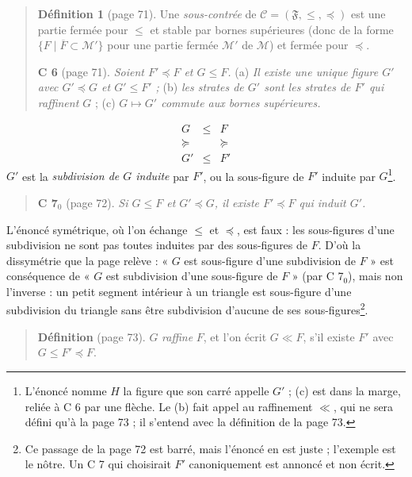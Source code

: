 \documentclass[11pt,a4paper]{article}
\begin{document}
\begin{quote}
\textbf{Définition 1} (page 71). Une \emph{sous-contrée} de $\mathcal{C} =
(\mathfrak{F}, \leq, \preccurlyeq)$ est une partie fermée pour $\leq$ et stable
par bornes supérieures (donc de la forme $\{F \mid \overline{F} \subset
\mathcal{M}'\}$ pour une partie fermée $\mathcal{M}'$ de $\mathcal{M}$) et
fermée pour $\preccurlyeq$.

\textbf{C 6} (page 71). \emph{Soient $F' \preccurlyeq F$ et $G \leq F$.} (a)
\emph{Il existe une unique figure $G'$ avec $G' \preccurlyeq G$ et $G' \leq
F'$ ;} (b) \emph{les strates de $G'$ sont les strates de $F'$ qui raffinent
$G$} ; (c) \emph{$G \mapsto G'$ commute aux bornes supérieures.}
\end{quote}
\[
\begin{array}{ccc}
G & \leq & F \\
\succcurlyeq & & \succcurlyeq \\
G' & \leq & F'
\end{array}
\]
$G'$ est la \emph{subdivision de $G$ induite} par $F'$, ou la sous-figure de
$F'$ induite par $G$\footnote{L'énoncé nomme $H$ la figure que son carré appelle
$G'$ ; (c) est dans la marge, reliée à C 6 par une flèche. Le (b) fait appel au
raffinement $\ll$, qui ne sera défini qu'à la page 73 ; il s'entend avec la
définition de la page 73.}.

\begin{quote}
\textbf{C 7}$_{0}$ (page 72). \emph{Si $G \leq F$ et $G' \preccurlyeq G$, il
existe $F' \preccurlyeq F$ qui induit $G'$.}
\end{quote}

L'énoncé symétrique, où l'on échange $\leq$ et $\preccurlyeq$, est faux : les
sous-figures d'une subdivision ne sont pas toutes induites par des sous-figures
de $F$. D'où la dissymétrie que la page relève : « $G$ est sous-figure d'une
subdivision de $F$ » est conséquence de « $G$ est subdivision d'une sous-figure
de $F$ » (par C 7$_{0}$), mais non l'inverse : un petit segment intérieur à
un triangle est sous-figure d'une subdivision du triangle sans être subdivision
d'aucune de ses sous-figures\footnote{Ce passage de la page 72 est barré, mais
l'énoncé en est juste ; l'exemple est le nôtre. Un C 7 qui choisirait $F'$
canoniquement est annoncé et non écrit.}.

\begin{quote}
\textbf{Définition} (page 73). $G$ \emph{raffine} $F$, et l'on écrit $G \ll F$,
s'il existe $F'$ avec $G \leq F' \preccurlyeq F$.
\end{quote}
\end{document}
